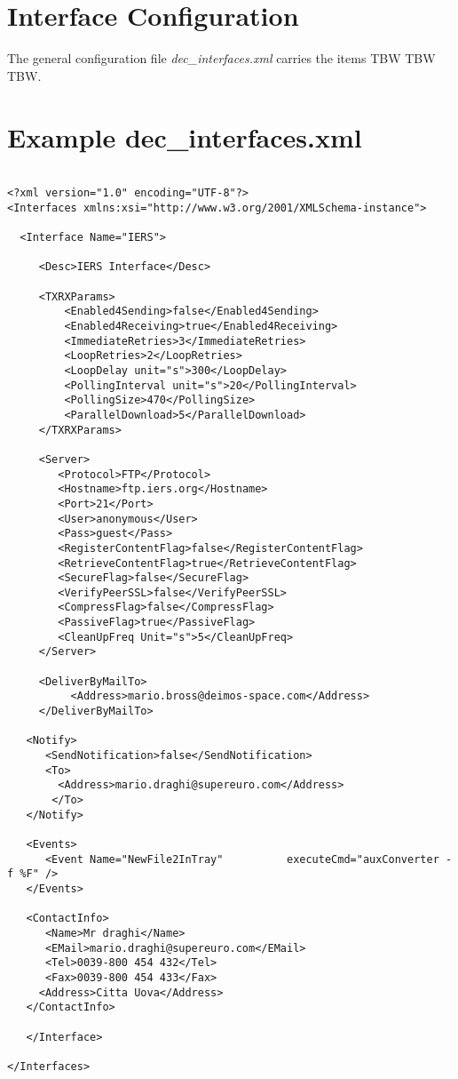 \documentclass[dec_sum_main.tex]{subfiles}
\begin{document}
\section{Interface Configuration}
 
\par
\noindent
The general configuration file \textit{dec\_interfaces.xml} carries the items TBW TBW TBW.


\label{decinterfacesxml}
\section{Example dec\_interfaces.xml}
\begin{verbatim}

<?xml version="1.0" encoding="UTF-8"?>
<Interfaces xmlns:xsi="http://www.w3.org/2001/XMLSchema-instance">

  <Interface Name="IERS">
     
     <Desc>IERS Interface</Desc>
     
     <TXRXParams>
         <Enabled4Sending>false</Enabled4Sending>
         <Enabled4Receiving>true</Enabled4Receiving>
         <ImmediateRetries>3</ImmediateRetries>
         <LoopRetries>2</LoopRetries>
         <LoopDelay unit="s">300</LoopDelay>
         <PollingInterval unit="s">20</PollingInterval>
         <PollingSize>470</PollingSize>
         <ParallelDownload>5</ParallelDownload>
     </TXRXParams>    

     <Server>
        <Protocol>FTP</Protocol>
        <Hostname>ftp.iers.org</Hostname>
        <Port>21</Port>
        <User>anonymous</User>
        <Pass>guest</Pass>
        <RegisterContentFlag>false</RegisterContentFlag>
        <RetrieveContentFlag>true</RetrieveContentFlag>
        <SecureFlag>false</SecureFlag>
        <VerifyPeerSSL>false</VerifyPeerSSL>
        <CompressFlag>false</CompressFlag>
        <PassiveFlag>true</PassiveFlag>
        <CleanUpFreq Unit="s">5</CleanUpFreq>
     </Server>
     
     <DeliverByMailTo>
	      <Address>mario.bross@deimos-space.com</Address>
     </DeliverByMailTo>

   <Notify>
	  <SendNotification>false</SendNotification>
	  <To>
		<Address>mario.draghi@supereuro.com</Address>
	   </To>
   </Notify>

   <Events>
      <Event Name="NewFile2InTray"          executeCmd="auxConverter -f %F" />
   </Events>

   <ContactInfo>
      <Name>Mr draghi</Name>
      <EMail>mario.draghi@supereuro.com</EMail>
      <Tel>0039-800 454 432</Tel>
      <Fax>0039-800 454 433</Fax>
     <Address>Citta Uova</Address>
   </ContactInfo>

   </Interface>

</Interfaces>

\end{verbatim}
\end{document}
